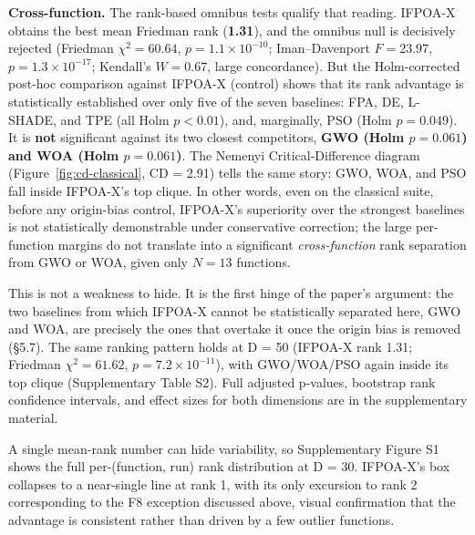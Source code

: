 \documentclass[preprint,12pt]{elsarticle}
\begin{document}
\textbf{Cross-function.} The rank-based omnibus tests qualify that reading. IFPOA-X obtains the best mean Friedman rank (\textbf{1.31}), and the omnibus null is decisively rejected (Friedman $\chi^2 = 60.64$, $p = 1.1\times10^{-10}$; Iman--Davenport $F = 23.97$, $p = 1.3\times10^{-17}$; Kendall's $W = 0.67$, large concordance). But the Holm-corrected post-hoc comparison against IFPOA-X (control) shows that its rank advantage is statistically established over only five of the seven baselines: FPA, DE, L-SHADE, and TPE (all Holm $p < 0.01$), and, marginally, PSO (Holm $p = 0.049$). It is \textbf{not} significant against its two closest competitors, \textbf{GWO (Holm $p = 0.061$) and WOA (Holm $p = 0.061$)}. The Nemenyi Critical-Difference diagram (Figure~\ref{fig:cd-classical}, CD = 2.91) tells the same story: GWO, WOA, and PSO fall inside IFPOA-X's top clique. In other words, even on the classical suite, before any origin-bias control, IFPOA-X's superiority over the strongest baselines is not statistically demonstrable under conservative correction; the large per-function margins do not translate into a significant \emph{cross-function} rank separation from GWO or WOA, given only $N = 13$ functions.

This is not a weakness to hide. It is the first hinge of the paper's argument: the two baselines from which IFPOA-X cannot be statistically separated here, GWO and WOA, are precisely the ones that overtake it once the origin bias is removed (\S5.7). The same ranking pattern holds at D = 50 (IFPOA-X rank 1.31; Friedman $\chi^2 = 61.62$, $p = 7.2\times10^{-11}$), with GWO/WOA/PSO again inside its top clique (Supplementary Table S2). Full adjusted p-values, bootstrap rank confidence intervals, and effect sizes for both dimensions are in the supplementary material.

A single mean-rank number can hide variability, so Supplementary Figure S1 shows the full per-(function, run) rank distribution at D = 30. IFPOA-X's box collapses to a near-single line at rank 1, with its only excursion to rank 2 corresponding to the F8 exception discussed above, visual confirmation that the advantage is consistent rather than driven by a few outlier functions.
\end{document}

